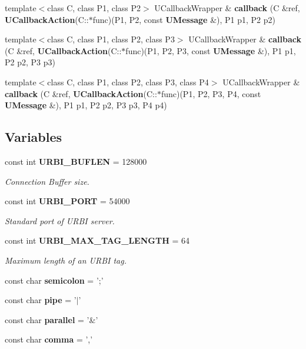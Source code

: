 \begin{CompactItemize}
\item 
template$<$class C, class P1, class P2$>$ UCallback\-Wrapper \& {\bf callback} (C \&ref, {\bf UCallback\-Action}(C::$\ast$func)(P1, P2, const {\bf UMessage} \&), P1 p1, P2 p2)\label{uabstractclient_8h_a44}

\item 
template$<$class C, class P1, class P2, class P3$>$ UCallback\-Wrapper \& {\bf callback} (C \&ref, {\bf UCallback\-Action}(C::$\ast$func)(P1, P2, P3, const {\bf UMessage} \&), P1 p1, P2 p2, P3 p3)\label{uabstractclient_8h_a45}

\item 
template$<$class C, class P1, class P2, class P3, class P4$>$ UCallback\-Wrapper \& {\bf callback} (C \&ref, {\bf UCallback\-Action}(C::$\ast$func)(P1, P2, P3, P4, const {\bf UMessage} \&), P1 p1, P2 p2, P3 p3, P4 p4)\label{uabstractclient_8h_a46}

\end{CompactItemize}
\subsection*{Variables}
\begin{CompactItemize}
\item 
const int {\bf URBI\_\-BUFLEN} = 128000\label{uabstractclient_8h_a3}

\begin{CompactList}\small\item\em Connection Buffer size. \item\end{CompactList}\item 
const int {\bf URBI\_\-PORT} = 54000\label{uabstractclient_8h_a4}

\begin{CompactList}\small\item\em Standard port of URBI server. \item\end{CompactList}\item 
const int {\bf URBI\_\-MAX\_\-TAG\_\-LENGTH} = 64\label{uabstractclient_8h_a5}

\begin{CompactList}\small\item\em Maximum length of an URBI tag. \item\end{CompactList}\item 
const char {\bf semicolon} = ';'\label{namespaceurbi_a0}

\item 
const char {\bf pipe} = '$|$'\label{namespaceurbi_a1}

\item 
const char {\bf parallel} = '\&'\label{namespaceurbi_a2}

\item 
const char {\bf comma} = ','\label{namespaceurbi_a3}

\end{CompactItemize}


